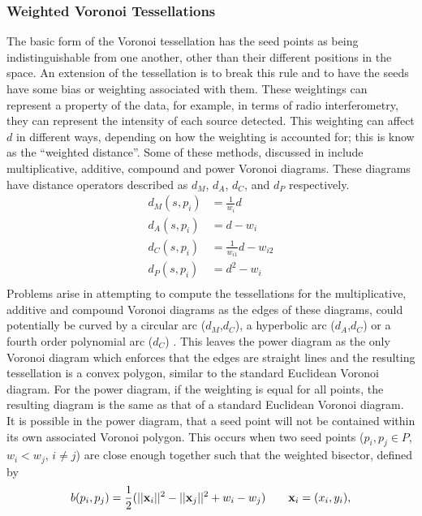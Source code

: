 \subsubsection{Weighted Voronoi Tessellations}\label{tes:ssec:wei}
The basic form of the Voronoi tessellation has the seed points as being indistinguishable from one another, other than their different positions in the space. An extension of the tessellation is to break this rule and to have the seeds have some bias or weighting associated with them. These weightings can represent a property of the data, for example, in terms of radio interferometry, they can represent the intensity of each source detected. This weighting can affect $d$ in different ways, depending on how the weighting is accounted for; this is know as the ``weighted distance''. Some of these methods, discussed in \citet{okabe2009spatial} include multiplicative, additive, compound and power Voronoi diagrams. These diagrams have distance operators described as $d_M$, $d_A$, $d_C$, and $d_P$ respectively.
%
\begin{equation}
\begin{align}
  d_M(s,p_i) &= \frac{1}{w_i}d			\\
  d_A(s,p_i) &= d - w_i				\\
  d_C(s,p_i) &= \frac{1}{w_{i1}}d - w_{i2}	\\
  d_P(s,p_i) &= d^2 - w_i			\\
\end{align}
\end{equation}
%
Problems arise in attempting to compute the tessellations for the multiplicative, additive and compound Voronoi diagrams as the edges of these diagrams, could potentially be curved by a circular arc ($d_M$,$d_C$), a hyperbolic arc ($d_A$,$d_C$) or a fourth order polynomial arc ($d_C$) \citep{okabe2009spatial}. This leaves the power diagram as the only Voronoi diagram which enforces that the edges are straight lines and the resulting tessellation is a convex polygon, similar to the standard Euclidean Voronoi diagram. For the power diagram, if the weighting is equal for all points, the resulting diagram is the same as that of a standard Euclidean Voronoi diagram. It is possible in the power diagram, that a seed point will not be contained within its own associated Voronoi polygon. This occurs when two seed points ($p_i,p_j \in P$, $w_i<w_j$, $i\neq j$) are close enough together such that the weighted bisector, defined by 
%
\begin{equation}
 b(p_i,p_j) = \frac{1}{2}(||\bold{x}_i||^2-||\bold{x}_j||^2+w_i-w_j) \qquad \bold{x}_i = (x_i,y_i),
\end{equation}
